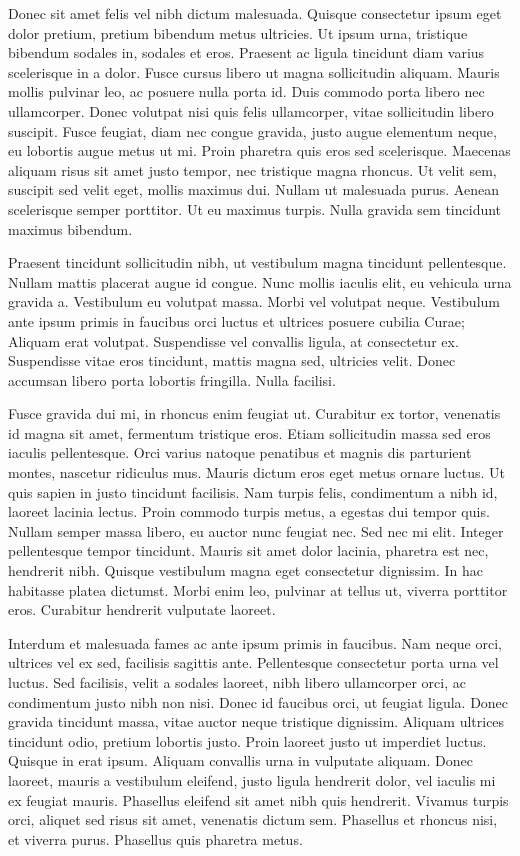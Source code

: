 Donec sit amet felis vel nibh dictum malesuada. Quisque consectetur ipsum eget dolor pretium, pretium bibendum metus ultricies. Ut ipsum urna, tristique bibendum sodales in, sodales et eros. Praesent ac ligula tincidunt diam varius scelerisque in a dolor. Fusce cursus libero ut magna sollicitudin aliquam. Mauris mollis pulvinar leo, ac posuere nulla porta id. Duis commodo porta libero nec ullamcorper. Donec volutpat nisi quis felis ullamcorper, vitae sollicitudin libero suscipit. Fusce feugiat, diam nec congue gravida, justo augue elementum neque, eu lobortis augue metus ut mi. Proin pharetra quis eros sed scelerisque. Maecenas aliquam risus sit amet justo tempor, nec tristique magna rhoncus. Ut velit sem, suscipit sed velit eget, mollis maximus dui. Nullam ut malesuada purus. Aenean scelerisque semper porttitor. Ut eu maximus turpis. Nulla gravida sem tincidunt maximus bibendum.

Praesent tincidunt sollicitudin nibh, ut vestibulum magna tincidunt pellentesque. Nullam mattis placerat augue id congue. Nunc mollis iaculis elit, eu vehicula urna gravida a. Vestibulum eu volutpat massa. Morbi vel volutpat neque. Vestibulum ante ipsum primis in faucibus orci luctus et ultrices posuere cubilia Curae; Aliquam erat volutpat. Suspendisse vel convallis ligula, at consectetur ex. Suspendisse vitae eros tincidunt, mattis magna sed, ultricies velit. Donec accumsan libero porta lobortis fringilla. Nulla facilisi.

Fusce gravida dui mi, in rhoncus enim feugiat ut. Curabitur ex tortor, venenatis id magna sit amet, fermentum tristique eros. Etiam sollicitudin massa sed eros iaculis pellentesque. Orci varius natoque penatibus et magnis dis parturient montes, nascetur ridiculus mus. Mauris dictum eros eget metus ornare luctus. Ut quis sapien in justo tincidunt facilisis. Nam turpis felis, condimentum a nibh id, laoreet lacinia lectus. Proin commodo turpis metus, a egestas dui tempor quis. Nullam semper massa libero, eu auctor nunc feugiat nec. Sed nec mi elit. Integer pellentesque tempor tincidunt. Mauris sit amet dolor lacinia, pharetra est nec, hendrerit nibh. Quisque vestibulum magna eget consectetur dignissim. In hac habitasse platea dictumst. Morbi enim leo, pulvinar at tellus ut, viverra porttitor eros. Curabitur hendrerit vulputate laoreet.

Interdum et malesuada fames ac ante ipsum primis in faucibus. Nam neque orci, ultrices vel ex sed, facilisis sagittis ante. Pellentesque consectetur porta urna vel luctus. Sed facilisis, velit a sodales laoreet, nibh libero ullamcorper orci, ac condimentum justo nibh non nisi. Donec id faucibus orci, ut feugiat ligula. Donec gravida tincidunt massa, vitae auctor neque tristique dignissim. Aliquam ultrices tincidunt odio, pretium lobortis justo. Proin laoreet justo ut imperdiet luctus. Quisque in erat ipsum. Aliquam convallis urna in vulputate aliquam. Donec laoreet, mauris a vestibulum eleifend, justo ligula hendrerit dolor, vel iaculis mi ex feugiat mauris. Phasellus eleifend sit amet nibh quis hendrerit. Vivamus turpis orci, aliquet sed risus sit amet, venenatis dictum sem. Phasellus et rhoncus nisi, et viverra purus. Phasellus quis pharetra metus.

